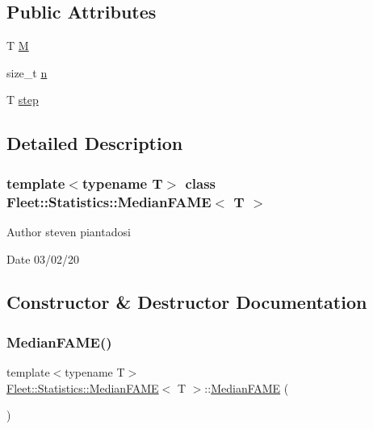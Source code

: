 \subsection*{Public Attributes}
\begin{DoxyCompactItemize}
\item 
T \hyperlink{class_fleet_1_1_statistics_1_1_median_f_a_m_e_a5906801f64045cd1dc7555857325c455}{M}
\item 
size\+\_\+t \hyperlink{class_fleet_1_1_statistics_1_1_median_f_a_m_e_abffd20d230e6aa48e8a8d0e33aab157a}{n}
\item 
T \hyperlink{class_fleet_1_1_statistics_1_1_median_f_a_m_e_a3451548541aad22bb7a1c35291faa357}{step}
\end{DoxyCompactItemize}


\subsection{Detailed Description}
\subsubsection*{template$<$typename T$>$\newline
class Fleet\+::\+Statistics\+::\+Median\+F\+A\+M\+E$<$ T $>$}

\begin{DoxyAuthor}{Author}
steven piantadosi 
\end{DoxyAuthor}
\begin{DoxyDate}{Date}
03/02/20 
\end{DoxyDate}


\subsection{Constructor \& Destructor Documentation}
\mbox{\label{class_fleet_1_1_statistics_1_1_median_f_a_m_e_a0be08191b9c7efbadc85e32cf650fe2c}} 
\subsubsection{\texorpdfstring{Median\+F\+A\+M\+E()}{MedianFAME()}}
{\footnotesize\ttfamily template$<$typename T$>$ \\
\hyperlink{class_fleet_1_1_statistics_1_1_median_f_a_m_e}{Fleet\+::\+Statistics\+::\+Median\+F\+A\+ME}$<$ T $>$\+::\hyperlink{class_fleet_1_1_statistics_1_1_median_f_a_m_e}{Median\+F\+A\+ME} (\begin{DoxyParamCaption}{ }\end{DoxyParamCaption})\hspace{0.3cm}{\ttfamily [inline]}}



